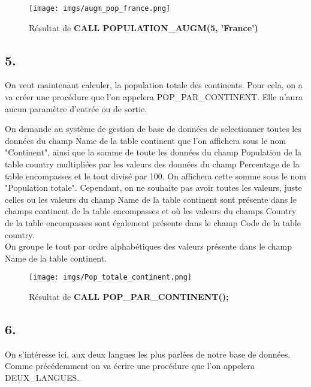 \documentclass[11pt,a4paper]{article}
\begin{document}
\begin{figure}[ht]
	\centering
	\texttt{[image: imgs/augm\_pop\_france.png]}
	\caption{Résultat de \textbf{CALL POPULATION\_AUGM(5, 'France')}}
	\label{fig11}
\end{figure}

\subsection*{5.}
On veut maintenant calculer, la population totale des continents. Pour cela, on a va créer une procédure que l'on appelera POP\_PAR\_CONTINENT. Elle n'aura aucun paramètre d'entrée ou de sortie.



On demande au système de gestion de base de données de selectionner toutes les données du champ Name de la table continent que l'on affichera sous le nom "Continent", ainsi que la somme de toute les données du champ Population de la table country multipliées par les valeurs des données du champ Percentage de la table encompasses et le tout divisé par 100. On affichera cette somme sous le nom "Population totale". Cependant, on ne souhaite pas avoir toutes les valeurs, juste celles ou les valeurs du champ Name de la table continent sont présente dans le champs continent de la table encompasses et où les valeurs du champs Country de la table encompasses sont également présente dans le champ Code de la table country.\\
On groupe le tout par ordre alphabétiques des valeurs présente dans le champ Name de la table continent.

\begin{figure}[ht]
	\centering
	\texttt{[image: imgs/Pop\_totale\_continent.png]}
	\caption{Résultat de \textbf{CALL POP\_PAR\_CONTINENT();}}
	\label{fig12}
\end{figure}

\subsection*{6.}
On s'intéresse ici, aux deux langues les plus parlées de notre base de données. Comme précédemment on va écrire une procédure que l'on appelera DEUX\_LANGUES.\\


\end{document}
